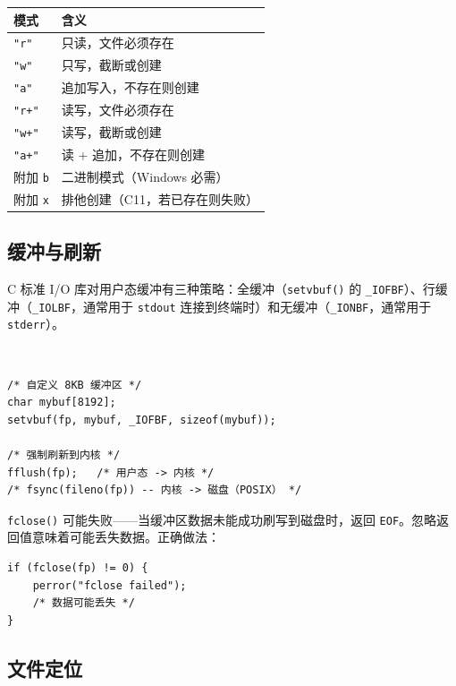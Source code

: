\documentclass[12pt,a4paper,fontset=fandol]{ctexbook}
\newcommand{\Fn}[1]{\texttt{#1()}}
\newcommand{\Tp}[1]{\texttt{#1}}
\newcommand{\clabel}{%
  \noindent\begin{tcolorbox}[sharp corners,colback=fileheadbg,colframe=fileheadbg,
    left=6pt,right=6pt,top=2pt,bottom=2pt,boxrule=0pt]
  \textcolor{white}{\small\bfseries\sffamily C}\end{tcolorbox}%
}
\begin{document}
\begin{guideline}[title=打开模式总结]
\begin{tabular}{ll}
\toprule
\textbf{模式} & \textbf{含义} \\
\midrule
\Tp{"r"}  & 只读，文件必须存在 \\
\Tp{"w"}  & 只写，截断或创建 \\
\Tp{"a"}  & 追加写入，不存在则创建 \\
\Tp{"r+"} & 读写，文件必须存在 \\
\Tp{"w+"} & 读写，截断或创建 \\
\Tp{"a+"} & 读 + 追加，不存在则创建 \\
\midrule
附加 \Tp{b} & 二进制模式（Windows 必需） \\
附加 \Tp{x} & 排他创建（C11，若已存在则失败） \\
\bottomrule
\end{tabular}
\end{guideline}

\subsection{缓冲与刷新}

C 标准 I/O 库对用户态缓冲有三种策略：全缓冲（\Fn{setvbuf} 的 \Tp{\_IOFBF}）、行缓冲（\Tp{\_IOLBF}，通常用于 \Tp{stdout} 连接到终端时）和无缓冲（\Tp{\_IONBF}，通常用于 \Tp{stderr}）。

\clabel
\begin{lstlisting}[style=cstyle]
/* 自定义 8KB 缓冲区 */
char mybuf[8192];
setvbuf(fp, mybuf, _IOFBF, sizeof(mybuf));

/* 强制刷新到内核 */
fflush(fp);   /* 用户态 -> 内核 */
/* fsync(fileno(fp)) -- 内核 -> 磁盘（POSIX） */
\end{lstlisting}

\begin{warning}[title=fclose 的返回值]
\Tp{fclose()} 可能失败——当缓冲区数据未能成功刷写到磁盘时，返回 \Tp{EOF}。忽略返回值意味着可能丢失数据。正确做法：

\begin{lstlisting}[style=cstyle]
if (fclose(fp) != 0) {
    perror("fclose failed");
    /* 数据可能丢失 */
}
\end{lstlisting}
\end{warning}

\subsection{文件定位}
\end{document}
